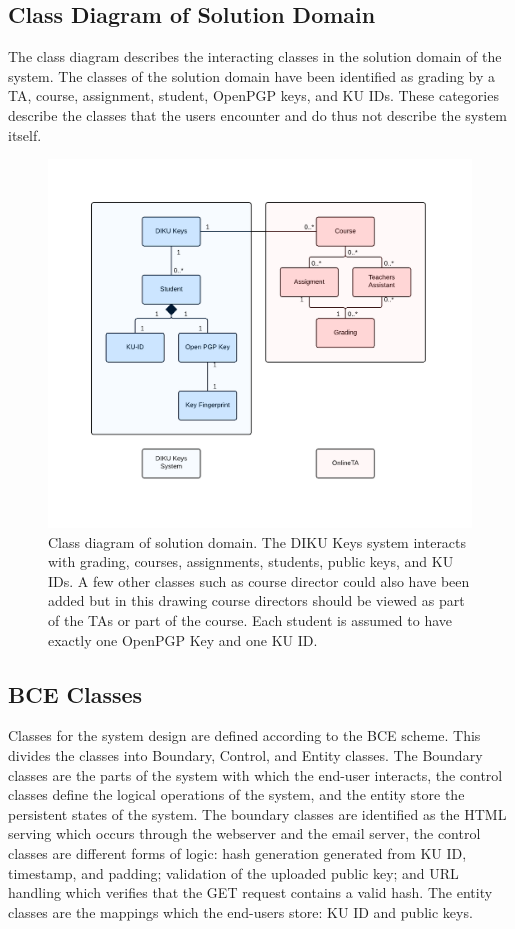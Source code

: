 \documentclass[11pt,a4paper]{report}
\begin{document}
\subsection{Class Diagram of Solution Domain}\label{subsec:class_diagram}
The class diagram describes the interacting classes in the solution domain of the system. The classes of the solution domain have been identified as grading by a TA, course, assignment, student, OpenPGP keys, and KU IDs. These categories describe the classes that the users encounter and do thus not describe the system itself.
\begin{figure}[H]
    \centering
    \includegraphics[width=\textwidth]{pictures/class_diagram_v3}
    \caption{Class diagram of solution domain. The DIKU Keys system interacts with grading, courses, assignments, students, public keys, and KU IDs. A few other classes such as course director could also have been added but in this drawing course directors should be viewed as part of the TAs or part of the course. Each student is assumed to have exactly one OpenPGP Key and one KU ID.}
    \label{fig:class_diagram_v3}
\end{figure}
\subsection{BCE Classes}\label{subsec:BCE}
Classes for the system design are defined according to the BCE scheme. This divides the classes into Boundary, Control, and Entity classes. The Boundary classes are the parts of the system with which the end-user interacts, the control classes define the logical operations of the system, and the entity store the persistent states of the system. The boundary classes are identified as the HTML serving which occurs through the webserver and the email server, the control classes are different forms of logic: hash generation generated from KU ID, timestamp, and padding; validation of the uploaded public key; and URL handling which verifies that the GET request contains a valid hash. The entity classes are the mappings which the end-users store: KU ID and public keys.
\end{document}
